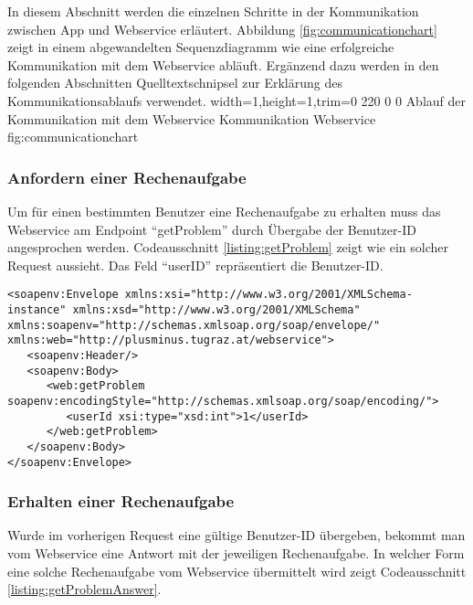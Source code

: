 In diesem Abschnitt werden die einzelnen Schritte in der Kommunikation zwischen App und Webservice erläutert.
Abbildung \ref{fig:communicationchart} zeigt in einem abgewandelten Sequenzdiagramm wie eine erfolgreiche Kommunikation
mit dem Webservice abläuft. Ergänzend dazu werden in den folgenden Abschnitten Quelltextschnipsel
zur Erklärung des Kommunikationsablaufs verwendet.
  {width=1\textwidth,height=1\textheight,trim=0 220 0 0}%
  {Ablauf der Kommunikation mit dem Webservice}%
  {Kommunikation Webservice}%
  {fig:communicationchart}%

\subsubsection{Anfordern einer Rechenaufgabe}
Um für einen bestimmten Benutzer eine Rechenaufgabe zu erhalten muss das Webservice am Endpoint \enquote{getProblem}
durch Übergabe der Benutzer-ID angesprochen werden. Codeausschnitt \ref{listing:getProblem} zeigt wie 
ein solcher Request aussieht. Das Feld \enquote{userID} repräsentiert die Benutzer-ID.

\begin{lstlisting}[caption=Anfordern einer Rechenaufgabe, label=listing:getProblem]
<soapenv:Envelope xmlns:xsi="http://www.w3.org/2001/XMLSchema-instance" xmlns:xsd="http://www.w3.org/2001/XMLSchema" xmlns:soapenv="http://schemas.xmlsoap.org/soap/envelope/" xmlns:web="http://plusminus.tugraz.at/webservice">
   <soapenv:Header/>
   <soapenv:Body>
      <web:getProblem soapenv:encodingStyle="http://schemas.xmlsoap.org/soap/encoding/">
         <userId xsi:type="xsd:int">1</userId>
      </web:getProblem>
   </soapenv:Body>
</soapenv:Envelope>
\end{lstlisting}

\subsubsection{Erhalten einer Rechenaufgabe}
Wurde im vorherigen Request eine gültige Benutzer-ID übergeben, bekommt man vom Webservice eine 
Antwort mit der jeweiligen Rechenaufgabe. In welcher Form eine solche Rechenaufgabe vom Webservice übermittelt
wird zeigt Codeausschnitt \ref{listing:getProblemAnswer}.

